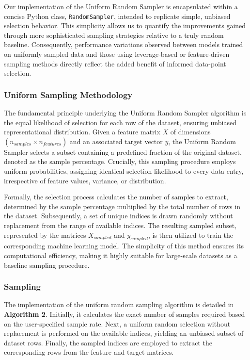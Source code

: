 \documentclass{article}
\theoremstyle{plain}
\theoremstyle{definition}
\theoremstyle{remark}
\begin{document}
Our implementation of the Uniform Random Sampler is encapsulated within a concise Python class, \texttt{RandomSampler}, intended to replicate simple, unbiased selection behavior. This simplicity allows us to quantify the improvements gained through more sophisticated sampling strategies relative to a truly random baseline. Consequently, performance variations observed between models trained on uniformly sampled data and those using leverage-based or feature-driven sampling methods directly reflect the added benefit of informed data-point selection.

\subsubsection{Uniform Sampling Methodology}

The fundamental principle underlying the Uniform Random Sampler algorithm is the equal likelihood of selection for each row of the dataset, ensuring unbiased representational distribution. Given a feature matrix $X$ of dimensions $(n_{samples} \times n_{features})$ and an associated target vector $y$, the Uniform Random Sampler selects a subset containing a predefined fraction of the original dataset, denoted as the sample percentage. Crucially, this sampling procedure employs uniform probabilities, assigning identical selection likelihood to every data entry, irrespective of feature values, variance, or distribution.

Formally, the selection process calculates the number of samples to extract, determined by the sample percentage multiplied by the total number of rows in the dataset. Subsequently, a set of unique indices is drawn randomly without replacement from the range of available indices. The resulting sampled subset, represented by the matrices $X_{sampled}$ and $y_{sampled}$, is then utilized to train the corresponding machine learning model. The simplicity of this method ensures its computational efficiency, making it highly suitable for large-scale datasets as a baseline sampling procedure.

\subsubsection{Sampling}

The implementation of the uniform random sampling algorithm is detailed in \textbf{Algorithm 2}. Initially, it calculates the exact number of samples required based on the user-specified sample rate. Next, a uniform random selection without replacement is performed on the available indices, yielding an unbiased subset of dataset rows. Finally, the sampled indices are employed to extract the corresponding rows from the feature and target matrices.
\end{document}
